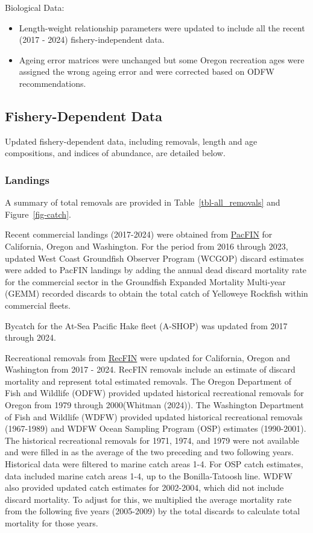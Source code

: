 \documentclass[
]{scrartcl}
\providecommand{\tightlist}{%
  \setlength{\itemsep}{0pt}\setlength{\parskip}{0pt}}\usepackage{longtable,booktabs,array}
\begin{document}
Biological Data:

\begin{itemize}
\tightlist
\item
  Length-weight relationship parameters were updated to include all the
  recent (2017 - 2024) fishery-independent data.
\item
  Ageing error matrices were unchanged but some Oregon recreation ages
  were assigned the wrong ageing error and were corrected based on ODFW
  recommendations.
\end{itemize}

\subsection{Fishery-Dependent Data}\label{fishery-dependent-data}

Updated fishery-dependent data, including removals, length and age
compositions, and indices of abundance, are detailed below.

\subsubsection{Landings}\label{landings}

A summary of total removals are provided in Table~\ref{tbl-all_removals}
and Figure~\ref{fig-catch}.

Recent commercial landings (2017-2024) were obtained from
\href{www.pacfin.psmfc.org}{PacFIN} for California, Oregon and
Washington. For the period from 2016 through 2023, updated West Coast
Groundfish Observer Program (WCGOP) discard estimates were added to
PacFIN landings by adding the annual dead discard mortality rate for the
commercial sector in the Groundfish Expanded Mortality Multi-year (GEMM)
recorded discards to obtain the total catch of Yelloweye Rockfish within
commercial fleets.

Bycatch for the At-Sea Pacific Hake fleet (A-SHOP) was updated from 2017
through 2024.

Recreational removals from \href{www.recfin.org}{RecFIN} were updated
for California, Oregon and Washington from 2017 - 2024. RecFIN removals
include an estimate of discard mortality and represent total estimated
removals. The Oregon Department of Fish and Wildlife (ODFW) provided
updated historical recreational removals for Oregon from 1979 through
2000(Whitman (2024)). The Washington Department of Fish and Wildlife
(WDFW) provided updated historical recreational removals (1967-1989) and
WDFW Ocean Sampling Program (OSP) estimates (1990-2001). The historical
recreational removals for 1971, 1974, and 1979 were not available and
were filled in as the average of the two preceding and two following
years. Historical data were filtered to marine catch areas 1-4. For OSP
catch estimates, data included marine catch areas 1-4, up to the
Bonilla-Tatoosh line. WDFW also provided updated catch estimates for
2002-2004, which did not include discard mortality. To adjust for this,
we multiplied the average mortality rate from the following five years
(2005-2009) by the total discards to calculate total mortality for those
years.
\end{document}
